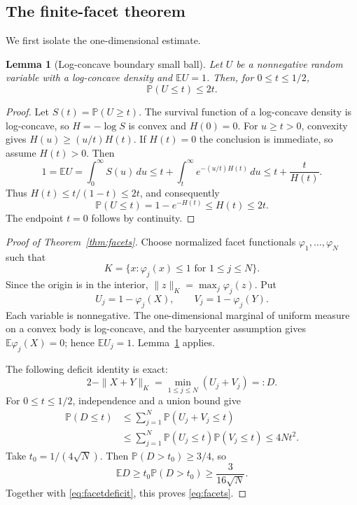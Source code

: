 \documentclass[11pt]{article}
\newtheorem{lemma}{Lemma}
\newcommand{\E}{\mathbb E}
\newcommand{\Pp}{\mathbb P}
\begin{document}
\subsection{The finite-facet theorem}

We first isolate the one-dimensional estimate.

\begin{lemma}[Log-concave boundary small ball]\label{lem:smallball}
Let $U$ be a nonnegative random variable with a log-concave density and
$\E U=1$.  Then, for $0\le t\le1/2$,
\[
 \Pp(U\le t)\le2t.
\]
\end{lemma}

\begin{proof}
Let $S(t)=\Pp(U\ge t)$.  The survival function of a log-concave density is
log-concave, so $H=-\log S$ is convex and $H(0)=0$.  For $u\ge t>0$,
convexity gives $H(u)\ge(u/t)H(t)$.  If $H(t)=0$ the conclusion is
immediate, so assume $H(t)>0$.  Then
\[
 1=\E U=\int_0^\infty S(u)\,du
 \le t+\int_t^\infty e^{-(u/t)H(t)}\,du
 \le t+\frac{t}{H(t)}.
\]
Thus $H(t)\le t/(1-t)\le2t$, and consequently
\[
 \Pp(U\le t)=1-e^{-H(t)}\le H(t)\le2t.
\]
The endpoint $t=0$ follows by continuity.
\end{proof}

\begin{proof}[Proof of Theorem~\ref{thm:facets}]
Choose normalized facet functionals $\varphi_1,\ldots,\varphi_N$ such that
\[
 K=\{x:\varphi_j(x)\le1\text{ for }1\le j\le N\}.
\]
Since the origin is in the interior,
$\|z\|_K=\max_j\varphi_j(z)$.  Put
\[
 U_j=1-\varphi_j(X),\qquad V_j=1-\varphi_j(Y).
\]
Each variable is nonnegative.  The one-dimensional marginal of uniform
measure on a convex body is log-concave, and the barycenter assumption gives
$\E\varphi_j(X)=0$; hence $\E U_j=1$.  Lemma~\ref{lem:smallball} applies.

The following deficit identity is exact:
\begin{equation}\label{eq:facetdeficit}
 2-\|X+Y\|_K=\min_{1\le j\le N}(U_j+V_j)=:D.
\end{equation}
For $0\le t\le1/2$, independence and a union bound give
\begin{align*}
 \Pp(D\le t)
 &\le\sum_{j=1}^N\Pp(U_j+V_j\le t)\\
 &\le\sum_{j=1}^N\Pp(U_j\le t)\Pp(V_j\le t)
 \le4Nt^2.
\end{align*}
Take $t_0=1/(4\sqrt N)$.  Then $\Pp(D>t_0)\ge3/4$, so
\[
 \E D\ge t_0\Pp(D>t_0)\ge\frac{3}{16\sqrt N}.
\]
Together with \eqref{eq:facetdeficit}, this proves \eqref{eq:facets}.
\end{proof}
\end{document}
